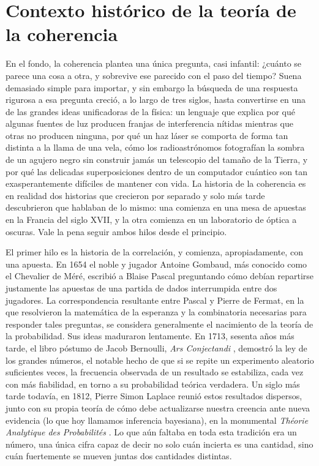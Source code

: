 \section{Contexto histórico de la teoría de la coherencia}

	En el fondo, la coherencia plantea una única pregunta, casi infantil: ¿cuánto se parece una cosa a otra, y sobrevive ese parecido con el paso del tiempo? Suena demasiado simple para importar, y sin embargo la búsqueda de una respuesta rigurosa a esa pregunta creció, a lo largo de tres siglos, hasta convertirse en una de las grandes ideas unificadoras de la física: un lenguaje que explica por qué algunas fuentes de luz producen franjas de interferencia nítidas mientras que otras no producen ninguna, por qué un haz láser se comporta de forma tan distinta a la llama de una vela, cómo los radioastrónomos fotografían la sombra de un agujero negro sin construir jamás un telescopio del tamaño de la Tierra, y por qué las delicadas superposiciones dentro de un computador cuántico son tan exasperantemente difíciles de mantener con vida. La historia de la coherencia es en realidad dos historias que crecieron por separado y solo más tarde descubrieron que hablaban de lo mismo: una comienza en una mesa de apuestas en la Francia del siglo XVII, y la otra comienza en un laboratorio de óptica a oscuras. Vale la pena seguir ambos hilos desde el principio.

	El primer hilo es la historia de la correlación, y comienza, apropiadamente, con una apuesta. En 1654 el noble y jugador Antoine Gombaud, más conocido como el Chevalier de Méré, escribió a Blaise Pascal preguntando cómo debían repartirse justamente las apuestas de una partida de dados interrumpida entre dos jugadores. La correspondencia resultante entre Pascal y Pierre de Fermat, en la que resolvieron la matemática de la esperanza y la combinatoria necesarias para responder tales preguntas, se considera generalmente el nacimiento de la teoría de la probabilidad. Sus ideas maduraron lentamente. En 1713, sesenta años más tarde, el libro póstumo de Jacob Bernoulli, \textit{Ars Conjectandi} \cite{bernoulli1713}, demostró la ley de los grandes números, el notable hecho de que si se repite un experimento aleatorio suficientes veces, la frecuencia observada de un resultado se estabiliza, cada vez con más fiabilidad, en torno a su probabilidad teórica verdadera. Un siglo más tarde todavía, en 1812, Pierre Simon Laplace reunió estos resultados dispersos, junto con su propia teoría de cómo debe actualizarse nuestra creencia ante nueva evidencia (lo que hoy llamamos inferencia bayesiana), en la monumental \textit{Théorie Analytique des Probabilités} \cite{laplace1812theorie}. Lo que aún faltaba en toda esta tradición era un número, una única cifra capaz de decir no solo cuán incierta es una cantidad, sino cuán fuertemente se mueven juntas dos cantidades distintas.

